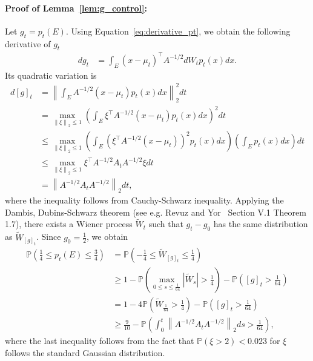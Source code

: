 \documentclass[11pt,twoside]{article}
\newcommand{\co}{A}
\theoremstyle{named}
\theoremstyle{plain}
\newcommand{\vecnorm}[2]{\left\| #1\right\|_{#2}}
\newcommand{\Prob}{\ensuremath{{\mathbb{P}}}}
\newcommand{\brackets}[1]{\left[ #1 \right]}
\newcommand{\parenth}[1]{\left( #1 \right)}
\newcommand{\abss}[1]{\left| #1 \right |}
\newcommand{\tp}{^\top}
\begin{document}
\paragraph{Proof of Lemma~\ref{lem:g_control}:} Let $g_t = p_t(E)$.
Using Equation~\eqref{eq:derivative_pt}, we obtain the following derivative of $g_t$
\begin{align*}
  d g_t &= \int_E (x - \mu_t)\tp \co^{-1/2} dW_t p_t(x) dx.
\end{align*}
Its quadratic variation is
\begin{align*}
  d\brackets{g}_t &= \vecnorm{\int_E \co^{-1/2} (x - \mu_t) p_t(x) dx }{2}^2 dt \\
  &= \max_{\vecnorm{\xi}{2} \leq 1} \parenth{\int_E \xi\tp \co^{-1/2} (x - \mu_t) p_t(x) dx}^2 dt \\
  &\leq \max_{\vecnorm{\xi}{2} \leq 1} \parenth{\int_E \parenth{\xi\tp \co^{-1/2} (x - \mu_t)}^2 p_t(x) dx} \parenth{\int_E p_t(x) dx} dt \\
  &\leq \max_{\vecnorm{\xi}{2} \leq 1} \xi\tp \co^{-1/2} A_t \co^{-1/2} \xi dt \\
  &= \vecnorm{\co^{-1/2} A_t \co^{-1/2}}{2} dt,
\end{align*}
where the inequality follows from Cauchy-Schwarz inequality.
Applying the Dambis, Dubins-Schwarz theorem (see e.g. Revuz and Yor~\cite{revuz2013continuous} Section V.1 Theorem 1.7), there exists a Wiener process $\tilde{W}_t$ such that $g_t - g_0$ has the same distribution as $\tilde{W}_{[g]_t}$. Since $g_0 = \frac{1}{2}$, we obtain
\begin{align*}
  \Prob\parenth{\frac{1}{4} \leq p_t(E) \leq \frac{3}{4}} &= \Prob\parenth{-\frac{1}{4} \leq \tilde{W}_{[g]_t} \leq \frac{1}{4}} \\
  &\geq 1 - \Prob\parenth{\max_{0 \leq s \leq \frac{1}{64}} \abss{\tilde{W}_s} > \frac{1}{4}} - \Prob([g]_t > \frac{1}{64}) \\
  &= 1 - 4 \Prob\parenth{\tilde{W}_{\frac{1}{64}} > \frac{1}{4}} - \Prob\parenth{[g]_t > \frac{1}{64}} \\
  &\geq \frac{9}{10} - \Prob\parenth{\int_0^t \vecnorm{\co^{-1/2} A_t \co^{-1/2}}{2} ds > \frac{1}{64}},
\end{align*}
where the last inequality follows from the fact that $\Prob\parenth{\xi > 2} < 0.023$ for $\xi$ follows the standard Gaussian distribution.
\end{document}
